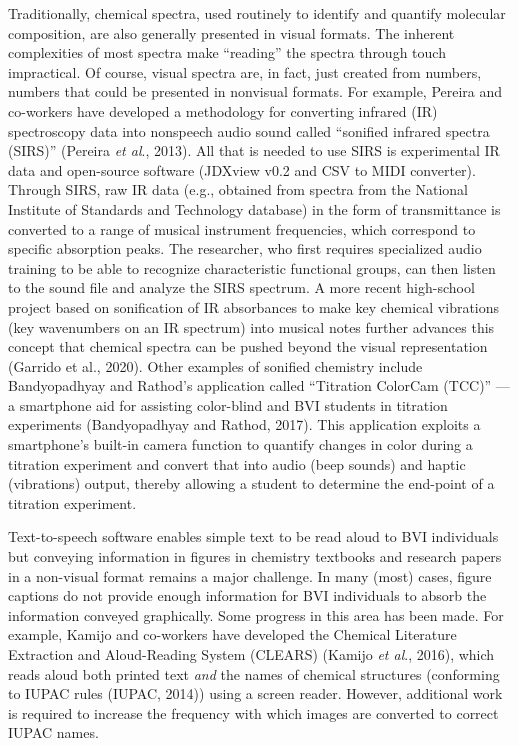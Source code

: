 \documentclass[11.5pt]{sig-alternate} %
\begin{document}
\begin{large}
Traditionally, chemical spectra, used routinely to identify and quantify molecular composition, are also generally presented in visual formats. The inherent complexities of most spectra make “reading” the spectra through touch impractical. Of course, visual spectra are, in fact, just created from numbers, numbers that could be presented in nonvisual formats. For example, Pereira and co-workers have developed a methodology for converting infrared (IR) spectroscopy data into nonspeech audio sound called “sonified infrared spectra (SIRS)” (Pereira \textit{et al}., 2013). All that is needed to use SIRS is experimental IR data and open-source software (JDXview v0.2 and CSV to MIDI converter). Through SIRS, raw IR data (e.g., obtained from spectra from the National Institute of Standards and Technology database) in the form of transmittance is converted to a range of musical instrument frequencies, which correspond to specific absorption peaks. The researcher, who first requires specialized audio training to be able to recognize characteristic functional groups, can then listen to the sound file and analyze the SIRS spectrum. A more recent high-school project based on sonification of IR absorbances to make key chemical vibrations (key wavenumbers on an IR spectrum) into musical notes further advances this concept that chemical spectra can be pushed beyond the visual representation (Garrido et al., 2020). Other examples of sonified chemistry include Bandyopadhyay and Rathod’s application called “Titration ColorCam (TCC)” — a smartphone aid for assisting color-blind and BVI students in titration experiments (Bandyopadhyay and Rathod, 2017). This application exploits a smartphone’s built-in camera function to quantify changes in color during a titration experiment and convert that into audio (beep sounds) and haptic (vibrations) output, thereby allowing a student to determine the end-point of a titration experiment.  

Text-to-speech software enables simple text to be read aloud to BVI individuals but conveying information in figures in chemistry textbooks and research papers in a non-visual format remains a major challenge. In many (most) cases, figure captions do not provide enough information for BVI individuals to absorb the information conveyed graphically. Some progress in this area has been made. For example, Kamijo and co-workers have developed the Chemical Literature Extraction and Aloud-Reading System (CLEARS) (Kamijo \textit{et al}., 2016), which reads aloud both printed text \textit{and} the names of chemical structures (conforming to IUPAC rules (IUPAC, 2014)) using a screen reader. However, additional work is required to increase the frequency with which images are converted to correct IUPAC names. 


\end{large}
\end{document}
